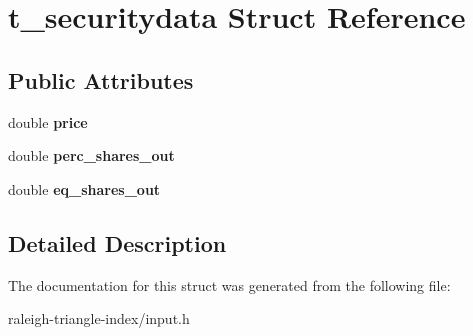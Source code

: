 \section{t\+\_\+securitydata Struct Reference}
\label{structt__securitydata}
\subsection*{Public Attributes}
\begin{DoxyCompactItemize}
\item 
double {\bfseries price}\label{structt__securitydata_afac1f6cd3e3186f5db6dd9ae5fc5afb6}

\item 
double {\bfseries perc\+\_\+shares\+\_\+out}\label{structt__securitydata_adb0f9c31e35cce915edc83683ef2111d}

\item 
double {\bfseries eq\+\_\+shares\+\_\+out}\label{structt__securitydata_ab586a22f27931dea6cb6bf2fd394a5d9}

\end{DoxyCompactItemize}


\subsection{Detailed Description}


The documentation for this struct was generated from the following file\+:\begin{DoxyCompactItemize}
\item 
raleigh-\/triangle-\/index/input.\+h\end{DoxyCompactItemize}
